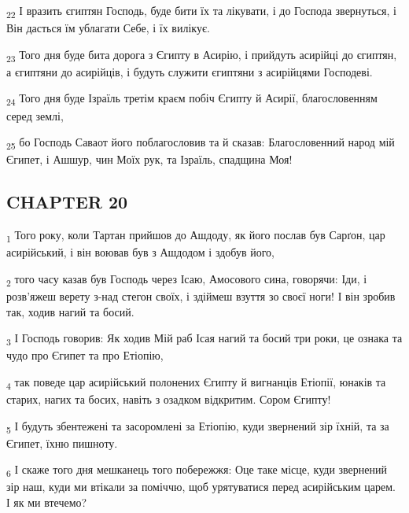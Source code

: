 \begin{tcolorbox}
\textsubscript{22} І вразить єгиптян Господь, буде бити їх та лікувати, і до Господа звернуться, і Він дасться їм ублагати Себе, і їх вилікує.
\end{tcolorbox}
\begin{tcolorbox}
\textsubscript{23} Того дня буде бита дорога з Єгипту в Асирію, і прийдуть асирійці до єгиптян, а єгиптяни до асирійців, і будуть служити єгиптяни з асирійцями Господеві.
\end{tcolorbox}
\begin{tcolorbox}
\textsubscript{24} Того дня буде Ізраїль третім краєм побіч Єгипту й Асирії, благословенням серед землі,
\end{tcolorbox}
\begin{tcolorbox}
\textsubscript{25} бо Господь Саваот його поблагословив та й сказав: Благословенний народ мій Єгипет, і Ашшур, чин Моїх рук, та Ізраїль, спадщина Моя!
\end{tcolorbox}
\subsection{CHAPTER 20}
\begin{tcolorbox}
\textsubscript{1} Того року, коли Тартан прийшов до Ашдоду, як його послав був Сарґон, цар асирійський, і він воював був з Ашдодом і здобув його,
\end{tcolorbox}
\begin{tcolorbox}
\textsubscript{2} того часу казав був Господь через Ісаю, Амосового сина, говорячи: Іди, і розв'яжеш верету з-над стегон своїх, і здіймеш взуття зо своєї ноги! І він зробив так, ходив нагий та босий.
\end{tcolorbox}
\begin{tcolorbox}
\textsubscript{3} І Господь говорив: Як ходив Мій раб Ісая нагий та босий три роки, це ознака та чудо про Єгипет та про Етіопію,
\end{tcolorbox}
\begin{tcolorbox}
\textsubscript{4} так поведе цар асирійський полонених Єгипту й вигнанців Етіопії, юнаків та старих, нагих та босих, навіть з озадком відкритим. Сором Єгипту!
\end{tcolorbox}
\begin{tcolorbox}
\textsubscript{5} І будуть збентежені та засоромлені за Етіопію, куди звернений зір їхній, та за Єгипет, їхню пишноту.
\end{tcolorbox}
\begin{tcolorbox}
\textsubscript{6} І скаже того дня мешканець того побережжя: Оце таке місце, куди звернений зір наш, куди ми втікали за поміччю, щоб урятуватися перед асирійським царем. І як ми втечемо?
\end{tcolorbox}
